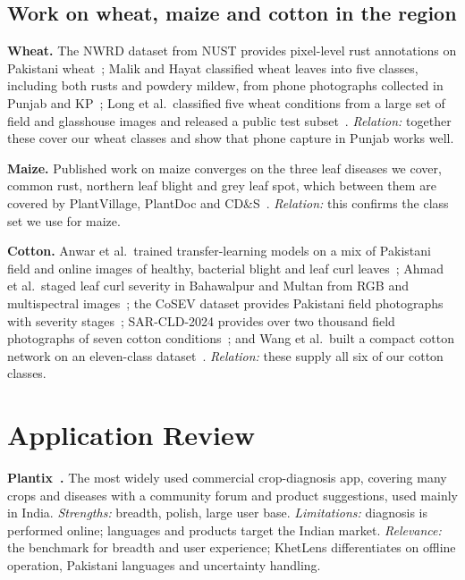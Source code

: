 \subsection{Work on wheat, maize and cotton in the region}
\label{sec:lit-region}
\textbf{Wheat.} The NWRD dataset from NUST provides pixel-level rust annotations on Pakistani wheat~\cite{anwar2023nwrd}; Malik and Hayat classified wheat leaves into five classes, including both rusts and powdery mildew, from phone photographs collected in Punjab and KP~\cite{malik2025wheatpk}; Long et al.\ classified five wheat conditions from a large set of field and glasshouse images and released a public test subset~\cite{long2024ukwheat}. \emph{Relation:} together these cover our wheat classes and show that phone capture in Punjab works well.

\textbf{Maize.} Published work on maize converges on the three leaf diseases we cover, common rust, northern leaf blight and grey leaf spot, which between them are covered by PlantVillage, PlantDoc and CD\&S~\cite{hughes2015plantvillage,singh2020plantdoc,ahmad2021cds}. \emph{Relation:} this confirms the class set we use for maize.

\textbf{Cotton.} Anwar et al.\ trained transfer-learning models on a mix of Pakistani field and online images of healthy, bacterial blight and leaf curl leaves~\cite{anwarcotton2023pk}; Ahmad et al.\ staged leaf curl severity in Bahawalpur and Multan from RGB and multispectral images~\cite{ahmad2024clcuvfusion}; the CoSEV dataset provides Pakistani field photographs with severity stages~\cite{noon2023cosev}; SAR-CLD-2024 provides over two thousand field photographs of seven cotton conditions~\cite{sarcld2024}; and Wang et al.\ built a compact cotton network on an eleven-class dataset~\cite{wang2025cotton}. \emph{Relation:} these supply all six of our cotton classes.

\section{Application Review}
\label{sec:apps}
\textbf{Plantix~\cite{plantix}.} The most widely used commercial crop-diagnosis app, covering many crops and diseases with a community forum and product suggestions, used mainly in India. \emph{Strengths:} breadth, polish, large user base. \emph{Limitations:} diagnosis is performed online; languages and products target the Indian market. \emph{Relevance:} the benchmark for breadth and user experience; KhetLens differentiates on offline operation, Pakistani languages and uncertainty handling.

